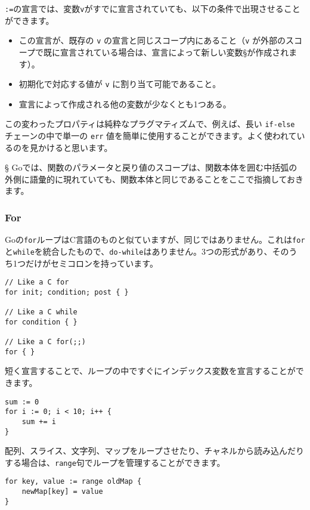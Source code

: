 \documentclass{jsarticle}
\begin{document}
\texttt{:=}の宣言では、変数\texttt{v}がすでに宣言されていても、以下の条件で出現させることができます。

\begin{itemize}
\item
  この宣言が、既存の \texttt{v}
  の宣言と同じスコープ内にあること（\texttt{v}
  が外部のスコープで既に宣言されている場合は、宣言によって新しい変数§が作成されます）。
\item
  初期化で対応する値が \texttt{v} に割り当て可能であること。
\item
  宣言によって作成される他の変数が少なくとも1つある。
\end{itemize}

この変わったプロパティは純粋なプラグマティズムで、例えば、長い
\texttt{if-else} チェーンの中で単一の \texttt{err}
値を簡単に使用することができます。よく使われているのを見かけると思います。

§
Goでは、関数のパラメータと戻り値のスコープは、関数本体を囲む中括弧の外側に語彙的に現れていても、関数本体と同じであることをここで指摘しておきます。

\subsubsection{For}

Goの\texttt{for}ループはC言語のものと似ていますが、同じではありません。これは\texttt{for}と\texttt{while}を統合したもので、\texttt{do-while}はありません。3つの形式があり、そのうち1つだけがセミコロンを持っています。

\begin{lstlisting}[numbers=none]
// Like a C for
for init; condition; post { }

// Like a C while
for condition { }

// Like a C for(;;)
for { }
\end{lstlisting}

短く宣言することで、ループの中ですぐにインデックス変数を宣言することができます。

\begin{lstlisting}[numbers=none]
sum := 0
for i := 0; i < 10; i++ {
    sum += i
}
\end{lstlisting}

配列、スライス、文字列、マップをループさせたり、チャネルから読み込んだりする場合は、\texttt{range}句でループを管理することができます。

\begin{lstlisting}[numbers=none]
for key, value := range oldMap {
    newMap[key] = value
}
\end{lstlisting}
\end{document}
